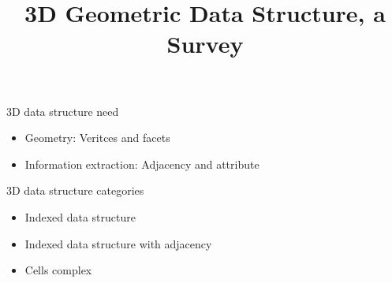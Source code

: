 \documentclass{article}
\title{3D Geometric Data Structure, a Survey}
\begin{document}
\maketitle

3D data structure need
\begin{itemize}
	\item Geometry: Veritces and facets
	\item Information extraction: Adjacency and attribute
\end{itemize}

3D data structure categories
\begin{itemize}
	\item Indexed data structure
	\item Indexed data structure with adjacency
	\item Cells complex
\end{itemize}



\end{document}
